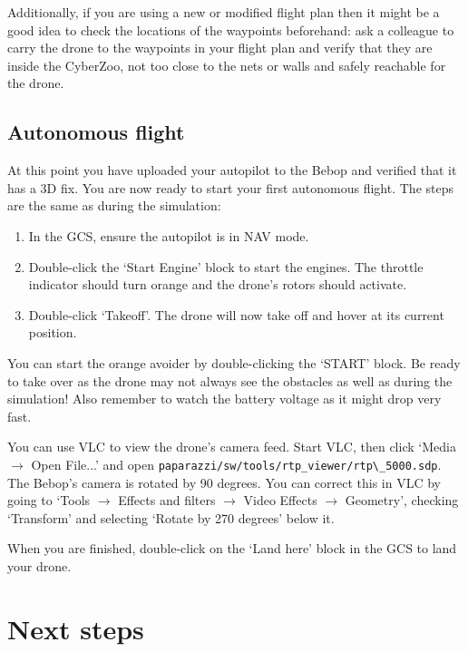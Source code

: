 Additionally, if you are using a new or modified flight plan then it might be a good idea to check the locations of the waypoints beforehand: ask a colleague to carry the drone to the waypoints in your flight plan and verify that they are inside the CyberZoo, not too close to the nets or walls and safely reachable for the drone.
	
\subsection*{Autonomous flight}
At this point you have uploaded your autopilot to the Bebop and verified that it has a 3D fix.
You are now ready to start your first autonomous flight.
The steps are the same as during the simulation:

\begin{enumerate}
	\item In the GCS, ensure the autopilot is in NAV mode.
	\item Double-click the `Start Engine' block to start the engines. The throttle indicator should turn orange and the drone's rotors should activate.
	\item Double-click `Takeoff'. The drone will now take off and hover at its current position.
\end{enumerate}

You can start the orange avoider by double-clicking the `START' block. Be ready to take over as the drone may not always see the obstacles as well as during the simulation! Also remember to watch the battery voltage as it might drop very fast.

You can use VLC to view the drone's camera feed. Start VLC, then click `Media $\rightarrow$ Open File...' and open \verb"paparazzi/sw/tools/rtp_viewer/rtp\_5000.sdp".
The Bebop's camera is rotated by 90 degrees. You can correct this in VLC by going to `Tools $\rightarrow$ Effects and filters $\rightarrow$ Video Effects $\rightarrow$ Geometry', checking `Transform' and selecting `Rotate by 270 degrees' below it.

When you are finished, double-click on the `Land here' block in the GCS to land your drone.

\section{Next steps}

